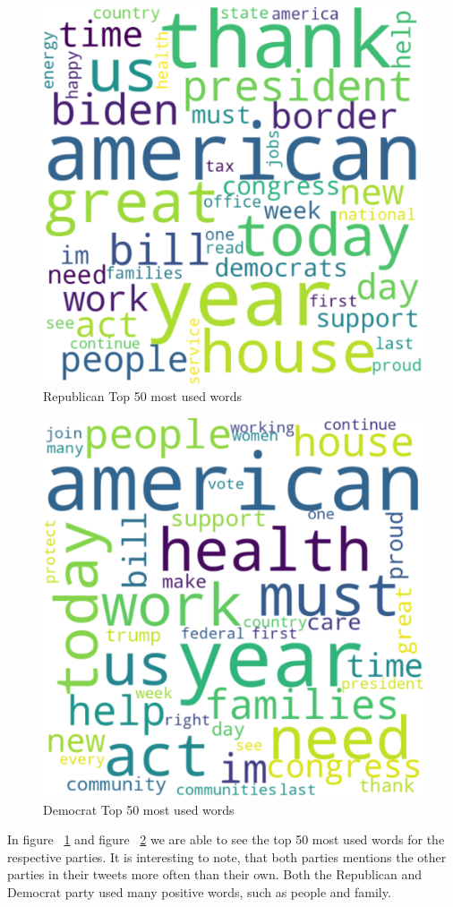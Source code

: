 \begin{figure}

\centering
  \centering
  \includegraphics[width=0.7\linewidth]{images/Kapitel3/Republican_word_cloud.png}
	\caption{\label{fig:sub1}Republican Top 50 most used words}{}
\end{figure}


\begin{figure}
  \centering
  \includegraphics[width=0.7\linewidth]{images/Kapitel3/Democrat_word_cloud.png}
	\caption{\label{fig:sub2}Democrat Top 50 most used words}{}
\end{figure}

In figure ~\ref{fig:sub1} and figure ~\ref{fig:sub2} we are able to see the top 50 most used words for the respective parties. It is interesting to note, that both parties mentions the other parties in their tweets more often than their own. Both the Republican and Democrat party used many positive words, such as people and family.

